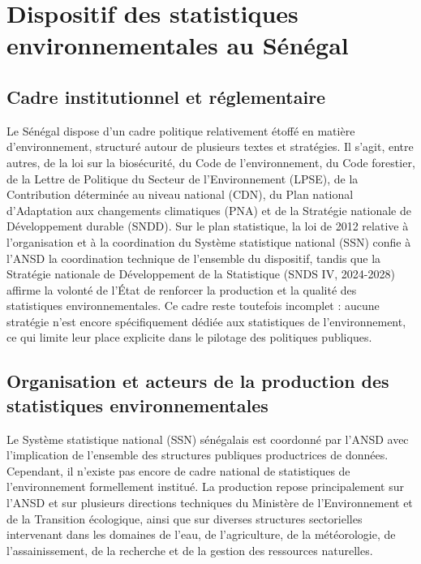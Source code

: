 \documentclass[12pt,a4paper]{report}
\begin{document}
\section{Dispositif des statistiques environnementales au Sénégal}

\subsection{Cadre institutionnel et réglementaire}

Le Sénégal dispose d'un cadre politique relativement étoffé en matière d'environnement, structuré autour de plusieurs textes et stratégies. Il s'agit, entre autres, de la loi sur la biosécurité, du Code de l'environnement, du Code forestier, de la Lettre de Politique du Secteur de l'Environnement (LPSE), de la Contribution déterminée au niveau national (CDN), du Plan national d'Adaptation aux changements climatiques (PNA) et de la Stratégie nationale de Développement durable (SNDD). Sur le plan statistique, la loi de 2012 relative à l'organisation et à la coordination du Système statistique national (SSN) confie à l'ANSD la coordination technique de l'ensemble du dispositif, tandis que la Stratégie nationale de Développement de la Statistique (SNDS IV, 2024-2028) affirme la volonté de l'État de renforcer la production et la qualité des statistiques environnementales. Ce cadre reste toutefois incomplet : aucune stratégie n'est encore spécifiquement dédiée aux statistiques de l'environnement, ce qui limite leur place explicite dans le pilotage des politiques publiques.

\subsection{Organisation et acteurs de la production des statistiques environnementales}

Le Système statistique national (SSN) sénégalais est coordonné par l'ANSD avec l'implication de l'ensemble des structures publiques productrices de données. Cependant, il n'existe pas encore de cadre national de statistiques de l'environnement formellement institué. La production repose principalement sur l'ANSD et sur plusieurs directions techniques du Ministère de l'Environnement et de la Transition écologique, ainsi que sur diverses structures sectorielles intervenant dans les domaines de l'eau, de l'agriculture, de la météorologie, de l'assainissement, de la recherche et de la gestion des ressources naturelles.
\end{document}
